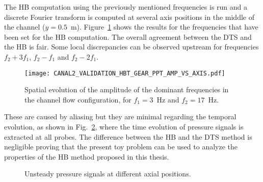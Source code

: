 The HB computation using the previously mentioned frequencies is
run and a discrete Fourier transform is computed at several axis positions
in the middle of the channel ($y=0.5$~m). Figure~\ref{fig:canal2_validation_hbt_gear_amp_vs_axis}
shows the results for the frequencies that have been set for the HB computation.
The overall agreement between the DTS and the HB is fair.  
Some local discrepancies can be
observed upstream for frequencies $f_2 + 3f_1$, $f_2 - f_1$ and $f_2 -
2f_1$. 
\begin{figure}[htb]
  \centering
  \texttt{[image: CANAL2\_VALIDATION\_HBT\_GEAR\_PPT\_AMP\_VS\_AXIS.pdf]}
  \caption{Spatial evolution of the amplitude of the dominant
    frequencies in the channel flow configuration, for $f_1 = 3$~Hz and $f_2 = 17$~Hz.}
  \label{fig:canal2_validation_hbt_gear_amp_vs_axis}
\end{figure}
These are caused by aliasing
but they are minimal regarding the temporal evolution, as
shown in Fig.~\ref{fig:canal2_validation_hbt_gear_time_ev}, where the
time evolution of pressure signals is extracted at all probes.  The
difference between the HB and the DTS method is negligible proving
that the present toy problem can be used to analyze the properties of 
the HB method proposed in this thesis.
\begin{figure}[htb]
  \centering 
   \quad{}
  \caption{Unsteady pressure signals at different axial positions.}
  \label{fig:canal2_validation_hbt_gear_time_ev}
\end{figure}
